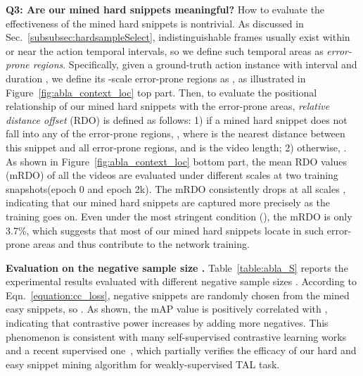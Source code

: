 \documentclass[final]{cvpr}
\begin{document}
\begin{table*}[t]
\textbf{Q3: Are our mined hard snippets meaningful?} How to evaluate the effectiveness of the mined hard snippets is nontrivial. As discussed in Sec.~\ref{subsubsec:hardsampleSelect}, indistinguishable frames usually exist within or near the action temporal intervals, so we define such temporal areas as \textit{error-prone regions}. Specifically, given a ground-truth action instance with interval  and duration , we define its -scale error-prone regions as , as illustrated in Figure~\ref{fig:abla_context_loc} top part. Then, to evaluate the positional relationship of our mined hard snippets with the error-prone areas, \emph{relative distance offset} (RDO) is defined as follows: 1) if a mined hard snippet does not fall into any of the error-prone regions, , where  is the nearest distance between this snippet and all error-prone regions, and  is the video length; 2) otherwise, . As shown in Figure~\ref{fig:abla_context_loc} bottom part, the mean RDO values (mRDO) of all the videos are evaluated under different scales  at two training snapshots(epoch 0 and epoch 2k). The mRDO consistently drops at all scales , indicating that our mined hard snippets are captured more precisely as the training goes on. Even under the most stringent condition (), the mRDO is only 3.7\%, which suggests that most of our mined hard snippets locate in such error-prone areas and thus contribute to the network training.

\begin{table}[!t]
\begin{center}
\caption{Ablation analysis on the negative sample size .}
\label{table:abla_S}
\end{center}
\vspace{-6pt}
\end{table}

\textbf{Evaluation on the negative sample size .} 
Table~\ref{table:abla_S} reports the experimental results evaluated with different negative sample sizes . According to Eqn.~\ref{equation:cc_loss}, negative snippets are randomly chosen from the mined easy snippets, so . As shown, the mAP value is positively correlated with , indicating that contrastive power increases by adding more negatives. This phenomenon is consistent with many self-supervised contrastive learning works~\cite{oord2018representation,he2020momentum,chen2020simple} and a recent supervised one~\cite{khosla2020supervised}, which partially verifies the efficacy of our hard and easy snippet mining algorithm for weakly-supervised TAL task.


\end{table*}
\end{document}
